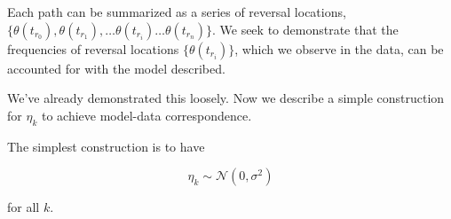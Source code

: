 Each path can be summarized as a series of reversal locations, $\{\theta(t_{r_0}),\theta(t_{r_1}), \dots \theta(t_{r_i}) \dots \theta(t_{r_n})\}$. We seek to demonstrate that the frequencies of reversal locations $\{\theta(t_{r_i})\}$, which we observe in the data, can be accounted for with the model described.

We've already demonstrated this loosely. Now we describe a simple construction for $\eta_k$ to achieve model-data correspondence.

The simplest construction is to have

$$\eta_k \sim \mathcal{N}(0,\sigma^2)$$ 

for all $k$.


 





